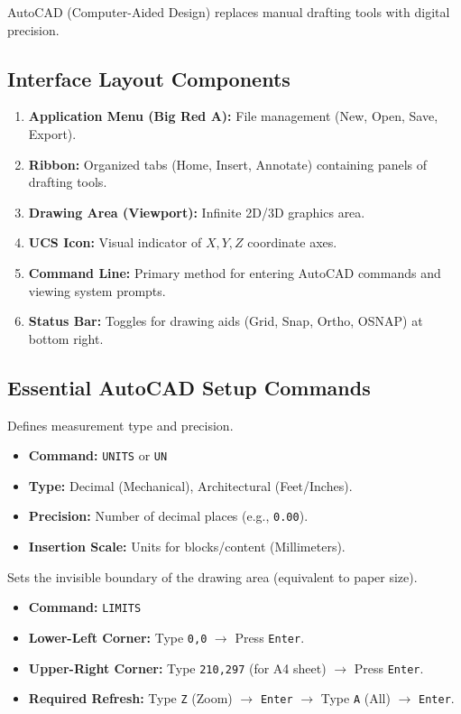 AutoCAD (Computer-Aided Design) replaces manual drafting tools with digital precision.

\subsection{Interface Layout Components}
\begin{enumerate}
    \item \textbf{Application Menu (Big Red A):} File management (New, Open, Save, Export).
    \item \textbf{Ribbon:} Organized tabs (Home, Insert, Annotate) containing panels of drafting tools.
    \item \textbf{Drawing Area (Viewport):} Infinite 2D/3D graphics area.
    \item \textbf{UCS Icon:} Visual indicator of $X, Y, Z$ coordinate axes.
    \item \textbf{Command Line:} Primary method for entering AutoCAD commands and viewing system prompts.
    \item \textbf{Status Bar:} Toggles for drawing aids (Grid, Snap, Ortho, OSNAP) at bottom right.
\end{enumerate}

\subsection{Essential AutoCAD Setup Commands}

\begin{autocadcmd}[UNITS]
Defines measurement type and precision.
\begin{itemize}
    \item \textbf{Command:} \texttt{UNITS} or \texttt{UN}
    \item \textbf{Type:} Decimal (Mechanical), Architectural (Feet/Inches).
    \item \textbf{Precision:} Number of decimal places (e.g., \texttt{0.00}).
    \item \textbf{Insertion Scale:} Units for blocks/content (Millimeters).
\end{itemize}
\end{autocadcmd}

\begin{autocadcmd}[LIMITS]
Sets the invisible boundary of the drawing area (equivalent to paper size).
\begin{itemize}
    \item \textbf{Command:} \texttt{LIMITS}
    \item \textbf{Lower-Left Corner:} Type \texttt{0,0} $\to$ Press \texttt{Enter}.
    \item \textbf{Upper-Right Corner:} Type \texttt{210,297} (for A4 sheet) $\to$ Press \texttt{Enter}.
    \item \textbf{Required Refresh:} Type \texttt{Z} (Zoom) $\to$ \texttt{Enter} $\to$ Type \texttt{A} (All) $\to$ \texttt{Enter}.
\end{itemize}
\end{autocadcmd}

